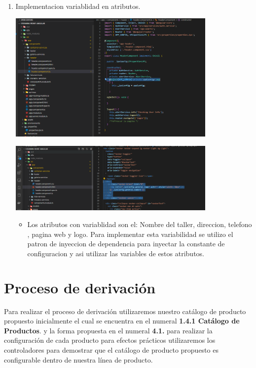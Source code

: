 \documentclass[10pt,a4paper,openany]{book}
\begin{document}
\begin{enumerate}

\item Implementacion variablidad en atributos.\\
\begin{center}
\includegraphics[width=0.8\textwidth]{oc_7}

\includegraphics[width=0.8\textwidth]{oc_8}
\end{center}
\begin{itemize}

\item Los atributos con variablidad son el: Nombre del taller, direccion, telefono , pagina web y logo. Para implementar esta variabilidad se utilizo el patron de inyeccion de dependencia para inyectar la constante de configuracion y asi utilizar las variables de estos atributos.


\end{itemize}



\end{enumerate}




\chapter{Proceso de derivación}
Para realizar el proceso de derivación utilizaremos nuestro catálogo de producto propuesto inicialmente el cual se encuentra en el numeral \textbf{1.4.1 Catálogo de Productos}. y la forma propuesta en el numeral \textbf{4.1.} para realizar la configuración de cada producto para efectos prácticos utilizaremos los controladores para demostrar que el catálogo de producto propuesto es configurable dentro de nuestra línea de producto.
\end{document}
